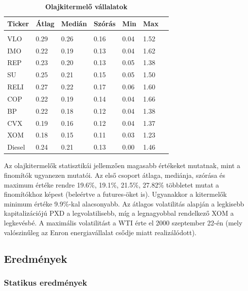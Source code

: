 \documentclass[12pt,bibliography=totoc]{article}
\begin{document}
\begin{table}[H]
\begin{subtable}[t]{0.45\textwidth}
\begin{tabular}{l | l l l l l l}
Ticker &Átlag	&Medián	&Szórás	&Min&	Max \\
\hline \\ [-1.5ex] 
VLO		&0.29	& 0.26	& 0.16	& 0.04	& 1.52      \\
IMO	      &0.22	& 0.19	& 0.13	& 0.04	& 1.62      \\
REP		&0.23	& 0.20	& 0.13	& 0.05	& 1.38      \\
SU		&0.25	& 0.21	& 0.15	& 0.05	& 1.50      \\
RELI		&0.27	& 0.22	& 0.17	& 0.06	& 1.60  \\
COP       &0.22	& 0.19	& 0.14	& 0.04	& 1.66      \\
BP		&0.22	& 0.18	& 0.12	& 0.04	& 1.38      \\
CVX		&0.19	& 0.16	& 0.12	& 0.04	& 1.37      \\
XOM	&0.18	& 0.15	& 0.11	& 0.03	& 1.23      \\
Diesel	&0.24	& 0.21     & 0.13	& 0.00     & 1.46    \\

\hline  
\end{tabular}
\caption{\textbf{Olajkitermelő vállalatok}}
\end{subtable}

\end{table}
Az olajkitermelők statisztikái jellemzően magasabb értékeket mutatnak, mint a finomítók ugyanezen mutatói. Az első csoport átlaga, mediánja, szórása és maximum értéke rendre 19.6\%,	19.1\%, 21.5\%, 27.82\% többletet mutat a finomítókhoz képest (beleértve a futures-öket is). Ugyanakkor a kitermelők minimum értéke 9.9\%-kal alacsonyabb. Az átlagos volatilitás alapján a legkisebb kapitalizációjú PXD a legvolatilisebb, míg a legnagyobbal rendelkező XOM a legkevésbé. A maximális volatilitást a WTI érte el 2000 szeptember 22-én (mely valószinűleg az Enron energiavállalat csődje miatt realizálódott).



\subsection{Eredmények}

\subsubsection{Statikus eredmények}
\end{document}
